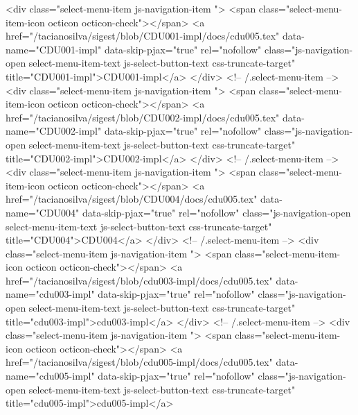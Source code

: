             <div class="select-menu-item js-navigation-item ">
              <span class="select-menu-item-icon octicon octicon-check"></span>
              <a href="/tacianosilva/sigest/blob/CDU001-impl/docs/cdu005.tex"
                 data-name="CDU001-impl"
                 data-skip-pjax="true"
                 rel="nofollow"
                 class="js-navigation-open select-menu-item-text js-select-button-text css-truncate-target"
                 title="CDU001-impl">CDU001-impl</a>
            </div> <!-- /.select-menu-item -->
            <div class="select-menu-item js-navigation-item ">
              <span class="select-menu-item-icon octicon octicon-check"></span>
              <a href="/tacianosilva/sigest/blob/CDU002-impl/docs/cdu005.tex"
                 data-name="CDU002-impl"
                 data-skip-pjax="true"
                 rel="nofollow"
                 class="js-navigation-open select-menu-item-text js-select-button-text css-truncate-target"
                 title="CDU002-impl">CDU002-impl</a>
            </div> <!-- /.select-menu-item -->
            <div class="select-menu-item js-navigation-item ">
              <span class="select-menu-item-icon octicon octicon-check"></span>
              <a href="/tacianosilva/sigest/blob/CDU004/docs/cdu005.tex"
                 data-name="CDU004"
                 data-skip-pjax="true"
                 rel="nofollow"
                 class="js-navigation-open select-menu-item-text js-select-button-text css-truncate-target"
                 title="CDU004">CDU004</a>
            </div> <!-- /.select-menu-item -->
            <div class="select-menu-item js-navigation-item ">
              <span class="select-menu-item-icon octicon octicon-check"></span>
              <a href="/tacianosilva/sigest/blob/cdu003-impl/docs/cdu005.tex"
                 data-name="cdu003-impl"
                 data-skip-pjax="true"
                 rel="nofollow"
                 class="js-navigation-open select-menu-item-text js-select-button-text css-truncate-target"
                 title="cdu003-impl">cdu003-impl</a>
            </div> <!-- /.select-menu-item -->
            <div class="select-menu-item js-navigation-item ">
              <span class="select-menu-item-icon octicon octicon-check"></span>
              <a href="/tacianosilva/sigest/blob/cdu005-impl/docs/cdu005.tex"
                 data-name="cdu005-impl"
                 data-skip-pjax="true"
                 rel="nofollow"
                 class="js-navigation-open select-menu-item-text js-select-button-text css-truncate-target"
                 title="cdu005-impl">cdu005-impl</a>
